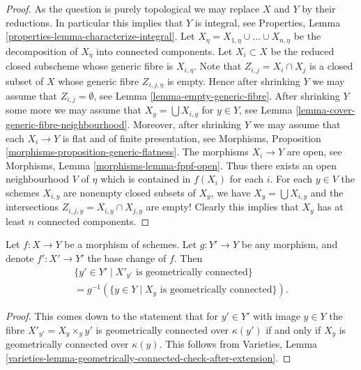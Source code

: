 \begin{proof}
As the question is purely topological we may replace $X$ and $Y$ by
their reductions. In particular this implies that $Y$ is integral, see
Properties, Lemma \ref{properties-lemma-characterize-integral}.
Let $X_\eta = X_{1, \eta} \cup \ldots \cup X_{n, \eta}$
be the decomposition of $X_\eta$ into connected components.
Let $X_i \subset X$ be the reduced closed subscheme whose generic
fibre is $X_{i, \eta}$. Note that $Z_{i, j} = X_i \cap X_j$
is a closed subset of $X$ whose generic fibre $Z_{i, j, \eta}$ is empty.
Hence after shrinking $Y$ we may assume that $Z_{i, j} = \emptyset$, see
Lemma \ref{lemma-empty-generic-fibre}.
After shrinking $Y$ some more we may assume that
$X_y = \bigcup X_{i, y}$ for $y \in Y$, see
Lemma \ref{lemma-cover-generic-fibre-neighbourhood}.
Moreover, after shrinking $Y$ we may assume that each $X_i \to Y$
is flat and of finite presentation, see
Morphisms, Proposition \ref{morphisms-proposition-generic-flatness}.
The morphisms $X_i \to Y$ are open, see
Morphisms, Lemma \ref{morphisms-lemma-fppf-open}.
Thus there exists an open neighbourhood $V$ of $\eta$ which is contained
in $f(X_i)$ for each $i$.
For each $y \in V$ the schemes $X_{i, y}$ are
nonempty closed subsets of $X_y$, we have $X_y = \bigcup X_{i, y}$
and the intersections $Z_{i, j, y} = X_{i, y} \cap X_{j, y}$
are empty! Clearly this implies that
$X_y$ has at least $n$ connected components.
\end{proof}

\begin{lemma}
\label{lemma-base-change-fibres-geometrically-connected}
Let $f : X \to Y$ be a morphism of schemes.
Let $g : Y' \to Y$ be any morphism, and denote
$f' : X' \to Y'$ the base change of $f$.
Then
\begin{align*}
\{y' \in Y' \mid X'_{y'}\text{ is geometrically connected}\} \\
= g^{-1}(\{y \in Y \mid X_y\text{ is geometrically connected}\}).
\end{align*}
\end{lemma}

\begin{proof}
This comes down to the statement that for $y' \in Y'$ with image
$y \in Y$ the fibre $X'_{y'} = X_y \times_y y'$ is geometrically
connected over $\kappa(y')$ if and only if $X_y$ is geometrically connected
over $\kappa(y)$. This follows from
Varieties,
Lemma \ref{varieties-lemma-geometrically-connected-check-after-extension}.
\end{proof}

